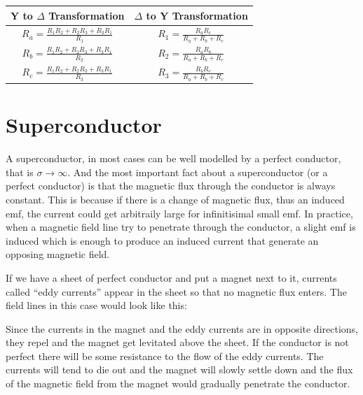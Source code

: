 \documentclass[english,a4paper,12pt]{report}
\begin{document}
\begin{center}
    \renewcommand{\arraystretch}{1.5} %
    \setlength{\tabcolsep}{12pt} %
    \begin{tabular}{|c|c|}
    \hline
    \textbf{Y to \(\Delta\) Transformation} & \textbf{\(\Delta\) to Y Transformation} \\
    \hline
    $R_a = \frac{R_1 R_2 + R_2 R_3 + R_3 R_1}{R_1}$ & $R_1 = \frac{R_a R_c}{R_a + R_b + R_c}$ \\
    $R_b = \frac{R_1 R_2 + R_2 R_3 + R_3 R_1}{R_2}$ & $R_2 = \frac{R_a R_b}{R_a + R_b + R_c}$ \\
    $R_c = \frac{R_1 R_2 + R_2 R_3 + R_3 R_1}{R_3}$ & $R_3 = \frac{R_b R_c}{R_a + R_b + R_c}$ \\
    \hline
    \end{tabular}
\end{center}



\section{Superconductor}

A superconductor, in most cases can be well modelled by a perfect conductor, that is \(\sigma \rightarrow \infty\). And the most important fact about a superconductor (or a perfect conductor) is that the magnetic flux through the conductor is always constant. This is because if there is a change of magnetic flux, thus an induced emf, the current could get arbitraily large for infinitisimal small emf. In practice, when a magnetic field line try to penetrate through the conductor, a slight emf is induced which is enough to produce an induced current that generate an opposing magnetic field.

If we have a sheet of perfect conductor and put a magnet next to it, currents called ``eddy currents'' appear in the sheet so that no magnetic flux enters. The field lines in this case would look like this:


Since the currents in the magnet and the eddy currents are in opposite directions, they repel and the magnet get levitated above the sheet. If the conductor is not perfect there will be some resistance to the flow of the eddy currents. The currents will tend to die out and the magnet will slowly settle down and the flux of the magnetic field from the magnet would gradually penetrate the conductor.
\end{document}
